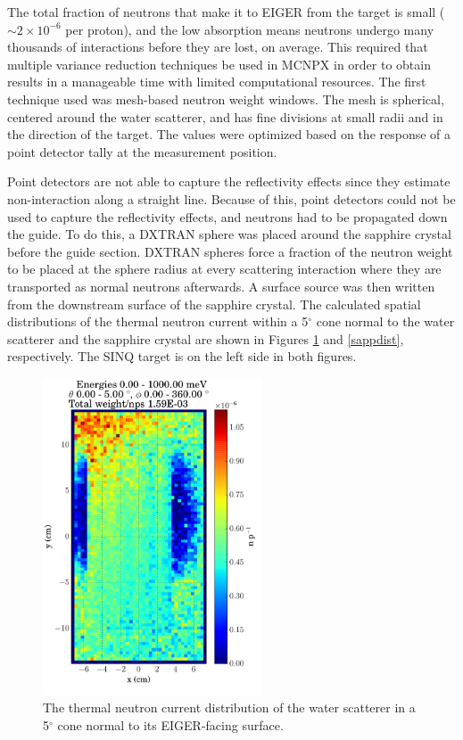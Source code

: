\documentclass[a4paper,
              ]{jacow}
\begin{document}
The total fraction of neutrons that make it to EIGER from the target is small ($\sim 2 \times 10^{-6}$ per proton), and the low absorption means neutrons undergo many thousands of interactions before they are lost, on average.  This required that multiple variance reduction techniques be used in MCNPX in order to obtain results in a manageable time with limited computational resources.  The first technique used was mesh-based neutron weight windows.  The mesh is spherical, centered around the water scatterer, and has fine divisions at small radii and in the direction of the target.  The values were optimized based on the response of a point detector tally at the measurement position.  %


Point detectors are not able to capture the reflectivity effects since they estimate non-interaction along a straight line.  Because of this, point detectors could not be used to capture the reflectivity effects, and neutrons had to be propagated down the guide.  To do this, a DXTRAN sphere was placed around the sapphire crystal before the guide section.  DXTRAN spheres force a fraction of the neutron weight to be placed at the sphere radius at every scattering interaction where they are transported as normal neutrons afterwards.  A surface source was then written from the downstream surface of the sapphire crystal.  The calculated spatial distributions of the thermal neutron current within a 5$^\circ$ cone normal to the water scatterer and the sapphire crystal are shown in Figures \ref{wsdist} and \ref{sappdist}, respectively.  The SINQ target is on the left side in both figures.

\begin{figure}[!htb]
   \centering
   \includegraphics*[trim = 0mm 8mm 0mm 1.5mm, width=65mm]{graphics/wsdist.pdf}
   \caption{The thermal neutron current distribution of the water scatterer in a 5$^\circ$ cone normal to its EIGER-facing surface.}
   \label{wsdist}
\end{figure}
\end{document}
